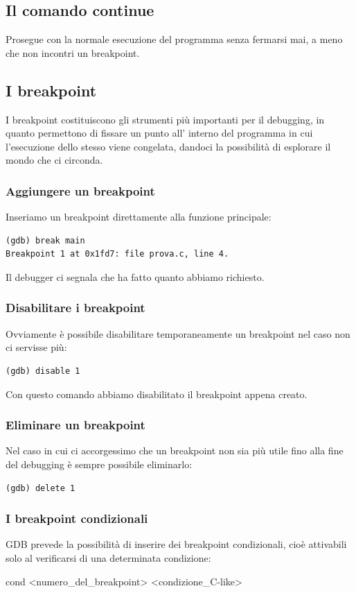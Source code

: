 \documentclass[a4paper,12pt]{article} %
\begin{document}
\subsection{Il comando continue}
Prosegue con la normale esecuzione del programma senza fermarsi mai, a meno che non incontri un breakpoint.
\subsection{I breakpoint}
I breakpoint costituiscono gli strumenti più importanti per il debugging, in quanto permettono di fissare un punto all' interno del programma in
cui l'esecuzione dello stesso viene congelata, dandoci la possibilità di esplorare il mondo che ci circonda.
\subsubsection{Aggiungere un breakpoint}
 Inseriamo un breakpoint direttamente alla funzione principale:
\begin{lstlisting}
(gdb) break main
Breakpoint 1 at 0x1fd7: file prova.c, line 4.
\end{lstlisting}
Il debugger ci segnala che ha fatto quanto abbiamo richiesto.
\subsubsection{Disabilitare i breakpoint}
Ovviamente è possibile disabilitare temporaneamente un breakpoint nel caso non ci servisse più:
\begin{lstlisting}
(gdb) disable 1
\end{lstlisting}
Con questo comando abbiamo disabilitato il breakpoint appena creato.
\subsubsection{Eliminare un breakpoint}
Nel caso in cui ci accorgessimo che un breakpoint non sia più utile fino alla fine del debugging è sempre possibile eliminarlo:
\begin{lstlisting}
(gdb) delete 1
\end{lstlisting}
\subsubsection{I breakpoint condizionali}
GDB prevede la possibilità di inserire dei breakpoint condizionali, cioè attivabili solo al verificarsi di una determinata condizione:
\begin{center}
cond <numero\_del\_breakpoint> <condizione\_C-like>
\end{center}
\end{document}
